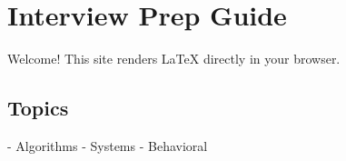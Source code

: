 \documentclass{article}
\begin{document}
\section*{Interview Prep Guide}
Welcome! This site renders \LaTeX{} directly in your browser.
\subsection*{Topics}
- Algorithms
- Systems
- Behavioral
\end{document}

